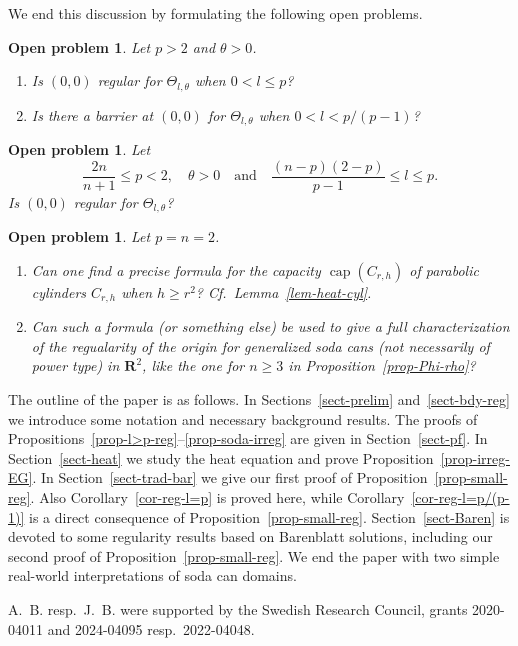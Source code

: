 \documentclass[a4paper, twoside]{article}
\theoremstyle{propositional}
\theoremstyle{descriptive}
\newtheorem{openprob}[thm]{Open problem}
\numberwithin{equation}{section}
\newenvironment{ack}{\medskip{\it Acknowledgement.}}{}
\newcommand{\R}{\mathbf{R}}
\DeclareMathOperator{\capp}{cap}
\begin{document}
We end this discussion by formulating the following open problems.

\begin{openprob}
Let $p>2$ and $\theta>0$. 
\begin{enumerate}
\item Is $(0,0)$ regular for $\Theta_{l,\theta}$ when $0 < l \le p$?
\item Is there a 
barrier at $(0,0)$ for $\Theta_{l,\theta}$ 
when $0 <l < p/(p-1)$?
\end{enumerate}
\end{openprob}

\begin{openprob}
Let 
\[
 \frac{2n}{n+1} \le p<2,\quad  \theta>0
\quad \text{and} \quad \frac{(n-p)(2-p)}{p-1} \le l\le p.
\]
Is $(0,0)$ regular for $\Theta_{l,\theta}$?
\end{openprob}

\begin{openprob}
Let $p=n=2$.
\begin{enumerate}
\item 
Can one find a precise formula for the capacity $\capp(C_{r,h})$ of
parabolic cylinders $C_{r,h}$ 
 when $h \ge r^2$? Cf.\ Lemma~\ref{lem-heat-cyl}. 
\item
Can such a formula (or something else) be used to 
give a full characterization 
of the regualarity of the origin
for generalized soda cans
(not necessarily of power type) in $\R^2$,
like the one for $n \ge 3$ in  Proposition~\ref{prop-Phi-rho}?
\end{enumerate}
\end{openprob}


The outline of the paper is as follows.
In Sections~\ref{sect-prelim} and~\ref{sect-bdy-reg} we introduce
some notation and necessary background results.
The proofs of Propositions~\ref{prop-l>p-reg}--\ref{prop-soda-irreg}
are  given in Section~\ref{sect-pf}.
In Section~\ref{sect-heat} we study the heat equation
and prove Proposition~\ref{prop-irreg-EG}.
In Section~\ref{sect-trad-bar} 
we give our first proof of Proposition~\ref{prop-small-reg}.
Also Corollary~\ref{cor-reg-l=p} is proved here, while
Corollary~\ref{cor-reg-l=p/(p-1)} is a direct consequence
of Proposition~\ref{prop-small-reg}.  
Section~\ref{sect-Baren} is devoted to some
regularity
results based on Barenblatt solutions,
including our second proof of Proposition~\ref{prop-small-reg}.
We end the paper with two 
simple  real-world interpretations of soda can domains.


\begin{ack}
A.~B. resp.\ J.~B. were supported by the Swedish Research Council,
  grants 2020-04011 and 2024-04095 resp.\ 2022-04048. 
\end{ack}
\end{document}
